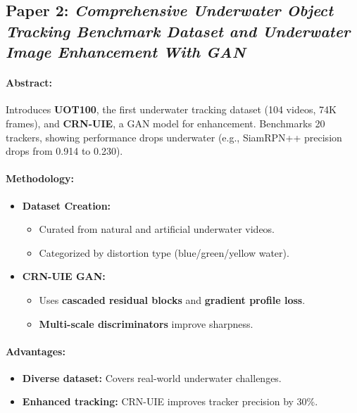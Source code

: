 \documentclass{article}
\begin{document}
\subsection{Paper 2: \textit{Comprehensive Underwater Object Tracking Benchmark Dataset and Underwater Image Enhancement With GAN\cite{Panetta_2021}}}

\paragraph{Abstract:}
Introduces \textbf{UOT100}, the first underwater tracking dataset (104 videos, 74K frames), and \textbf{CRN-UIE}, a GAN model for enhancement. Benchmarks 20 trackers, showing performance drops underwater (e.g., SiamRPN++ precision drops from 0.914 to 0.230).

\paragraph{Methodology:}
\begin{itemize}
    \item \textbf{Dataset Creation:}
          \begin{itemize}
              \item Curated from natural and artificial underwater videos.
              \item Categorized by distortion type (blue/green/yellow water).
          \end{itemize}

    \item \textbf{CRN-UIE GAN:}
          \begin{itemize}
              \item Uses \textbf{cascaded residual blocks} and \textbf{gradient profile loss}.
              \item \textbf{Multi-scale discriminators} improve sharpness.
          \end{itemize}
\end{itemize}

\paragraph{Advantages:}
\begin{itemize}
    \item \textbf{Diverse dataset:} Covers real-world underwater challenges.
    \item \textbf{Enhanced tracking:} CRN-UIE improves tracker precision by 30\%.
\end{itemize}
\end{document}
